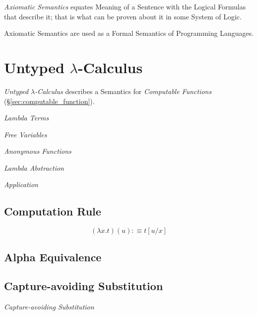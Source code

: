 \emph{Axiomatic Semantics} equates Meaning of a Sentence with the
Logical Formulas that describe it; that is what can be proven about it
in some System of Logic.

Axiomatic Semantics are used as a Formal Semantics of Programming
Languages.



\section{Untyped $\lambda$-Calculus}\label{sec:untyped_lambda}

\emph{Untyped $\lambda$-Calculus} describes a Semantics for
\emph{Computable Functions} (\S\ref{sec:computable_function}).

\emph{Lambda Terms}

\emph{Free Variables}

\emph{Anonymous Functions}

\emph{Lambda Abstraction}

\emph{Application}

\subsection{Computation Rule}\label{subsec:computation_rule}

\[
    (\lambda x.t)(u) :\equiv t[u/x]
\]

\subsection{Alpha Equivalence}\label{subsec:alpha_equivalent}

\subsection{Capture-avoiding Substitution}\label{subsec:capture_avoiding}

\emph{Capture-avoiding Substitution}

